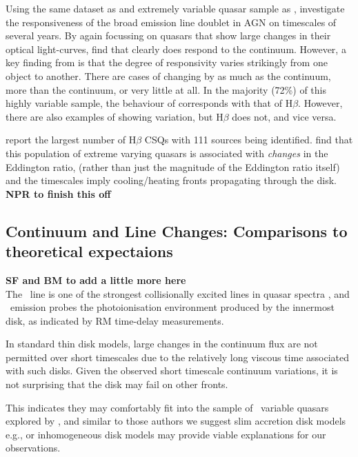 \documentclass[fleqn,usenatbib]{mnras}
\begin{document}
Using the same dataset as and extremely variable quasar sample
as \citet{MacLeod2019}, \citet{Homan2019}
investigate the responsiveness of the \mgii broad emission line
doublet in AGN on timescales of several years.  By again focussing on quasars that show large
changes in their optical light-curves, \citet{Homan2019} find that
\mgii clearly does respond to the continuum.  However, a key finding
from \citet{Homan2019} is that the degree of responsivity varies
strikingly from one object to another.  There are cases of \mgii
changing by as much as the continuum, more than the continuum, or very
little at all.  In the majority (72\%) of this highly variable sample,
the behaviour of \mgii corresponds with that of H$\beta$.  However,
there are also examples of \mgii showing variation, but H$\beta$ does
not, and vice versa.

\citet{Graham2019b} report the largest number of H$\beta$ CSQs with 111
sources being identified. \citet{Graham2019b} find that this population
of extreme varying quasars is associated with {\it changes} in the
Eddington ratio, (rather than just the magnitude of the Eddington
ratio itself) and the timescales imply cooling/heating fronts
propagating through the disk.\\
{\bf NPR to finish this off} \\


\subsection{Continuum and Line Changes: Comparisons to theoretical expectaions}
{\bf SF and BM to add a little more here}\\
The \civ\ line is one of the strongest collisionally excited lines in quasar spectra \citep[e.g.][]{HamannFerland1999}, and \civ\ emission probes the photoionisation environment produced by the innermost disk, as indicated by RM time-delay measurements. 


In standard \citet{SS73} thin disk models, large changes in the continuum flux are not permitted over short timescales due to the relatively long viscous time associated with such disks. Given the observed short timescale continuum variations, it is not surprising that the \citet{SS73} disk may fail on other fronts. %

This indicates they may comfortably fit into the sample of \civ\ variable quasars explored by \citet{Dyer2019}, and similar to those authors we suggest slim accretion disk models e.g., \citet[][]{Abramowicz1988} or inhomogeneous disk models
\citep[e.g.,][]{DexterAgol2011} may provide viable explanations for our observations.
\end{document}
